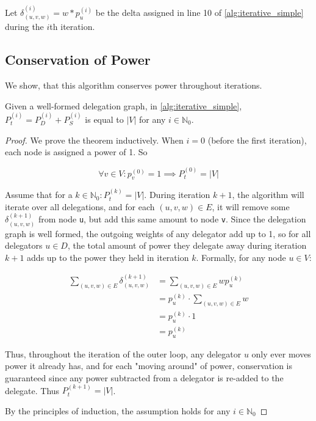 Let $\delta_{(u, v, w)}^{(i)} = w * p_u^{(i)}$ be the delta assigned in line 10 of \cref{alg:iterative_simple} during the $i$th iteration.

\subsection{Conservation of Power}

We show, that this algorithm conserves power throughout iterations.

\begin{theorem}
\label{theo:iterative_cons_of_power}
Given a well-formed delegation graph, in \cref{alg:iterative_simple}, $P_t^{(i)} = P_D^{(i)} + P_S^{(i)}$ is equal to $|V|$ for any $i \in \mathbb{N}_0$.
\end{theorem}
\begin{proof}

We prove the theorem inductively. When $i = 0$ (before the first iteration), each node is assigned a power of 1. So 

\[
\forall v \in V: p_v^{(0)} = 1 \implies P_t^{(0)} = |V|
\]

Assume that for a $k \in \mathbb{N}_0: P_t^{(k)} = |V|$. During iteration $k+1$, the algorithm will iterate over all delegations, and for each $(u, v, w) \in E$, it will remove some $\delta_{(u, v, w)}^{(k+1)}$ from node \texttt{u}, but add this same amount to node \texttt{v}. Since the delegation graph is well formed, the outgoing weights of any delegator add up to 1, so for all delegators $u \in D$, the total amount of power they delegate away during iteration $k+1$ adds up to the power they held in iteration $k$. Formally, for any node $u \in V$:

\begin{align*}
\sum_{(u, v, w) \in E} \delta_{(u, v, w)}^{(k+1)} &=  \sum_{(u, v, w) \in E} wp_u^{(k)} \\
&= p_u^{(k)}  \cdot \sum_{(u, v, w) \in E} w \\
&= p_u^{(k)} \cdot 1 \\
&= p_u^{(k)}
\end{align*}

Thus, throughout the iteration of the outer loop, any delegator $u$ only ever moves power it already has, and for each "moving around" of power, conservation is guaranteed since any power subtracted from a delegator is re-added to the delegate. Thus $P_t^{(k+1)} = |V|$. 

By the principles of induction, the assumption holds for any $i \in \mathbb{N}_0$

\end{proof}

